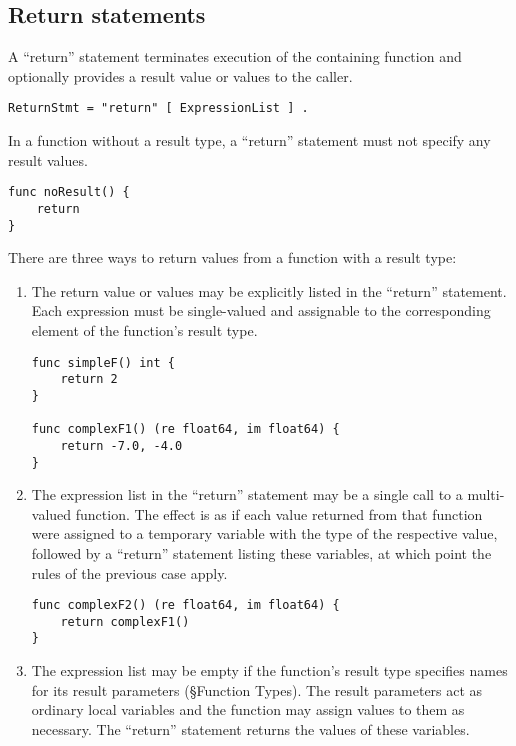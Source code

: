 {\subsection*{Return statements}

A ``return'' statement terminates execution of the containing function
and optionally provides a result value or values to the caller.

\begin{Verbatim}[frame=single]
ReturnStmt = "return" [ ExpressionList ] .
\end{Verbatim}

In a function without a result type, a ``return'' statement must not
specify any result values.

\begin{Verbatim}[frame=single]
func noResult() {
    return
}
\end{Verbatim}

There are three ways to return values from a function with a result
type:

\begin{enumerate}
\item
  The return value or values may be explicitly listed in the ``return''
  statement. Each expression must be single-valued and
  assignable to the corresponding element of
  the function's result type.

\begin{Verbatim}[frame=single]
func simpleF() int {
    return 2
}

func complexF1() (re float64, im float64) {
    return -7.0, -4.0
}
\end{Verbatim}
\item
  The expression list in the ``return'' statement may be a single call
  to a multi-valued function. The effect is as if each value returned
  from that function were assigned to a temporary variable with the type
  of the respective value, followed by a ``return'' statement listing
  these variables, at which point the rules of the previous case apply.

\begin{Verbatim}[frame=single]
func complexF2() (re float64, im float64) {
    return complexF1()
}
\end{Verbatim}
\item
  The expression list may be empty if the function's result type
  specifies names for its result parameters
  (§Function Types). The result parameters
  act as ordinary local variables and the function may assign values to
  them as necessary. The ``return'' statement returns the values of
  these variables.


\end{enumerate}}
